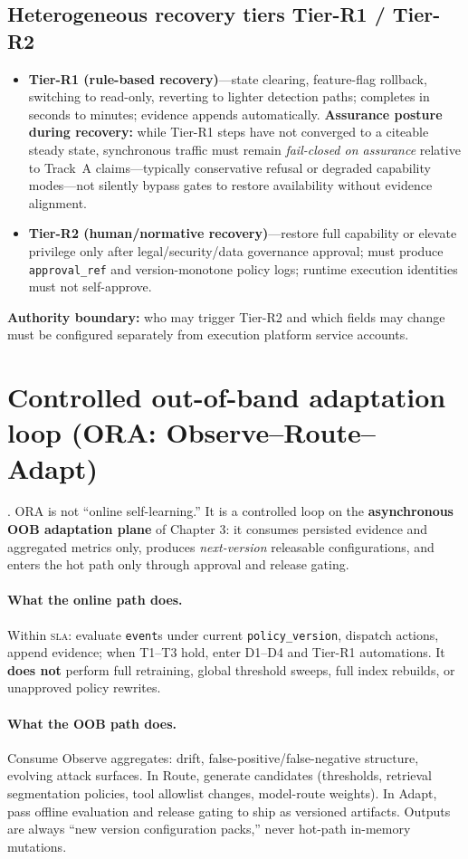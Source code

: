 \documentclass[11pt,a4paper]{report}
\begin{document}
\subsection{Heterogeneous recovery tiers Tier-R1 / Tier-R2}
\begin{itemize}
  \item \textbf{Tier-R1 (rule-based recovery)}—state clearing, feature-flag rollback, switching to read-only, reverting to lighter detection paths; completes in seconds to minutes; evidence appends automatically. \textbf{Assurance posture during recovery:} while Tier-R1 steps have not converged to a citeable steady state, synchronous traffic must remain \emph{fail-closed on assurance} relative to Track~A claims---typically conservative refusal or degraded capability modes---not silently bypass gates to restore availability without evidence alignment.
  \item \textbf{Tier-R2 (human/normative recovery)}—restore full capability or elevate privilege only after legal/security/data governance approval; must produce \texttt{approval\_ref} and version-monotone policy logs; runtime execution identities must not self-approve.
\end{itemize}
\textbf{Authority boundary:} who may trigger Tier-R2 and which fields may change must be configured separately from execution platform service accounts.

\section{Controlled out-of-band adaptation loop (ORA: Observe--Route--Adapt)}
\ControlPlane{}. ORA is not “online self-learning.” It is a controlled loop on the \textbf{asynchronous OOB adaptation plane} of Chapter 3: it consumes persisted evidence and aggregated metrics only, produces \emph{next-version} releasable configurations, and enters the hot path only through approval and release gating.

\paragraph{What the online path does.} Within \textsc{sla}: evaluate \texttt{event}s under current \texttt{policy\_version}, dispatch actions, append evidence; when T1--T3 hold, enter D1--D4 and Tier-R1 automations. It \textbf{does not} perform full retraining, global threshold sweeps, full index rebuilds, or unapproved policy rewrites.

\paragraph{What the OOB path does.} Consume Observe aggregates: drift, false-positive/false-negative structure, evolving attack surfaces. In Route, generate candidates (thresholds, retrieval segmentation policies, tool allowlist changes, model-route weights). In Adapt, pass offline evaluation and release gating to ship as versioned artifacts. Outputs are always “new version configuration packs,” never hot-path in-memory mutations.
\end{document}
